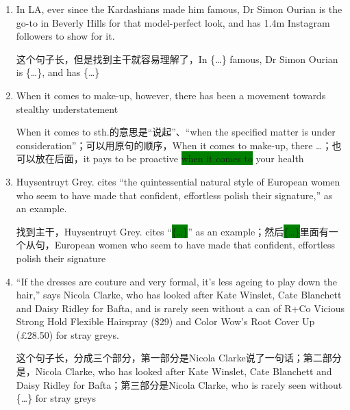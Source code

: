 \documentclass[UTF8]{ctexart}
\begin{document}
\begin{enumerate}
\item In LA, ever since the Kardashians made him famous, Dr Simon Ourian is the go-to in Beverly Hills for that model-perfect look, and has 1.4m Instagram followers to show for it.\label{sen:5}

这个句子长，但是找到主干就容易理解了，In \{\dots\} famous, Dr Simon Ourian is \{\dots\}, and has \{\dots\}

\item When it comes to make-up, however, there has been a movement towards stealthy understatement\label{sen:6}

When it comes to sth.的意思是“说起”、“when the specified matter is under consideration”；可以用原句的顺序，When it comes to make-up, there \dots；也可以放在后面，it pays to be proactive \colorbox{green}{when it comes to} your health

\item Huysentruyt Grey. cites “the quintessential natural style of European women who seem to have made that confident, effortless polish their signature,” as an example.\label{sen:7}

找到主干，Huysentruyt Grey. cites “\colorbox{green}{\{\dots\}}” as an example；然后\colorbox{green}{\{\dots\}}里面有一个从句，European women who seem to have made that confident, effortless polish their signature

\item “If the dresses are couture and very formal, it’s less ageing to play down the hair,” says Nicola Clarke, who has looked after Kate Winslet, Cate Blanchett and Daisy Ridley for Bafta, and is rarely seen without a can of R+Co Vicious Strong Hold Flexible Hairspray (\$29) and Color Wow’s Root Cover Up (£28.50) for stray greys.\label{sen:8}

这个句子长，分成三个部分，第一部分是Nicola Clarke说了一句话；第二部分是，Nicola Clarke, who has looked after Kate Winslet, Cate Blanchett and Daisy Ridley for Bafta；第三部分是Nicola Clarke, who is rarely seen without \{\dots\} for stray greys

\end{enumerate}
\end{document}
